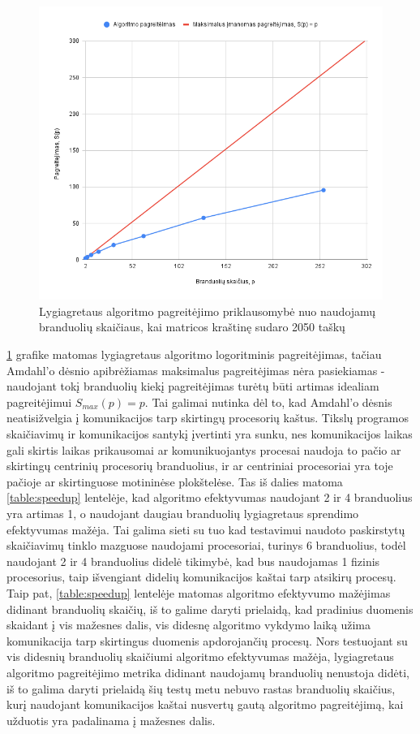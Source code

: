 \documentclass{VUMIFPSbakalaurinis}
\begin{document}
\begin{figure}[H]
    \centering
    \includegraphics[scale=0.5]{img/parallel_speedup.png}
    \caption{Lygiagretaus algoritmo pagreitėjimo priklausomybė nuo naudojamų branduolių skaičiaus, kai matricos kraštinę sudaro 2050 taškų}
    \label{img:parallel_speedup}
\end{figure}


\ref{img:parallel_speedup} grafike matomas lygiagretaus algoritmo logoritminis pagreitėjimas, tačiau Amdahl'o dėsnio \cite{amdahl1967validity} apibrėžiamas maksimalus pagreitėjimas nėra pasiekiamas - naudojant tokį branduolių kiekį pagreitėjimas turėtų būti artimas idealiam pagreitėjimui  $S_{max}(p)=p$.
Tai galimai nutinka dėl to, kad Amdahl'o dėsnis neatisižvelgia į komunikacijos tarp skirtingų procesorių kaštus.
Tikslų programos skaičiavimų ir komunikacijos santykį įvertinti yra sunku, nes komunikacijos laikas gali skirtis laikas prikausomai ar komunikuojantys procesai naudoja to pačio ar skirtingų centrinių procesorių branduolius, 
ir ar centriniai procesoriai yra toje pačioje ar skirtinguose motininėse plokštelėse. 
Tas iš dalies matoma \ref{table:speedup} lentelėje, kad algoritmo efektyvumas naudojant 2 ir 4 branduolius yra artimas 1, o naudojant daugiau branduolių lygiagretaus sprendimo efektyvumas mažėja.
Tai galima sieti su tuo kad testavimui naudoto paskirstytų skaičiavimų tinklo mazguose naudojami procesoriai, turinys 6 branduolius, todėl naudojant 2 ir 4 branduolius didelė tikimybė, kad bus naudojamas 1 fizinis procesorius, taip išvengiant didelių komunikacijos kaštai tarp atsikirų procesų.
Taip pat, \ref{table:speedup} lentelėje matomas algoritmo efektyvumo mažėjimas didinant branduolių skaičių, iš to galime daryti prielaidą, kad pradinius duomenis skaidant į vis mažesnes dalis, vis didesnę algoritmo vykdymo laiką užima komunikacija tarp skirtingus duomenis apdorojančių procesų.
Nors testuojant su vis didesnių branduolių skaičiumi algoritmo efektyvumas mažėja, lygiagretaus algoritmo pagreitėjimo metrika didinant naudojamų branduolių nenustoja didėti, iš to galima daryti prielaidą šių testų metu nebuvo rastas branduolių skaičius, kurį naudojant komunikacijos kaštai nusvertų gautą algoritmo pagreitėjimą, kai užduotis yra padalinama į mažesnes dalis. 
\end{document}
